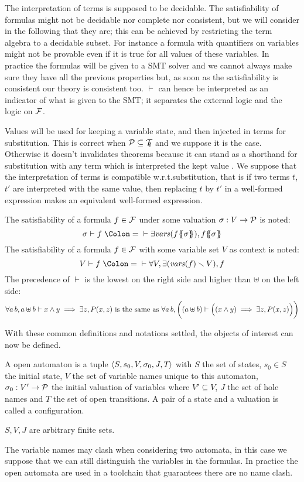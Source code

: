 \documentclass{article}
\begin{document}
The interpretation of terms is supposed to be decidable.
The satisfiability of formulas might not be decidable nor complete nor consistent,
but we will consider in the following that they are; this can be achieved by restricting the term algebra to a decidable subset.
For instance a formula with quantifiers on variables might not be provable even if it is true for all values of these variables.
In practice the formulas will be given to a SMT solver and we cannot always make sure they have all the previous properties but, as soon as the satisfiability is consistent our theory is consistent too.
\(\vdash\) can hence be interpreted as an indicator of what is given to the SMT; it separates the external logic and the logic on \({\mathcal{F}}\).

Values will be used for keeping a variable state, and then injected in terms for substitution.
This is correct when \(\mathcal{P} \subseteq {\mathcal{T}}_{\!\!\emptyset}\) and we suppose it is the case.
Otherwise it doesn't invalidates theorems because it can stand as a shorthand for substitution with any term which is interpreted the kept value .
We suppose that the interpretation of terms is compatible w.r.t.\@ substitution, that is if two terms \(t\), \(t'\) are interpreted with the same value, then replacing \(t\) by \(t'\) in a well-formed expression makes an equivalent well-formed expression.
\begin{noti}
 The satisfiability of a formula \(f \in {\mathcal{F}}\) under some valuation \(\sigma: V \to \mathcal{P}\) is noted:
\[ \sigma \vdash f \defnotation \vdash \exists \fvars{f\psubst{\sigma}}, f\psubst{\sigma} \]
 The satisfiability of a formula \(f \in {\mathcal{F}}\) with some variable set \(V\) as context is noted:
\[ V \vdash f \defnotation \vdash \forall V, \exists\mpar{\fvars{f} \setminus V}, f \]
 The precedence of \(\vdash\) is the lowest on the right side and higher than \(\uplus\) on the left side:
\[ \forall a \, b, a \uplus b \vdash x \wedge y \implies \exists z, P{\left(x,z\right)} \text{ is the same as } \forall a \, b, \bigg((a \uplus b) \vdash \Big((x \wedge y) \implies \exists z, P{\left(x,z\right)}\Big)\bigg) \]
\end{noti}
With these common definitions and notations settled, the objects of interest can now be defined.
\begin{defi}
A open automaton is a tuple \(\left<S_{},s_{0},V_{},\sigma_{0},J_{},T_{}\right>\) with \(S\) the set of states, \(s_0 \in S\) the initial state, \(V\) the set of variable names unique to this automaton, \(\sigma_0: V' \to \mathcal{P}\) the initial valuation of variables where \(V' \subseteq V\), \(J\) the set of hole names and \(T\) the set of open transitions.
A pair of a state and a valuation is called a configuration.

\(S, V, J\) are arbitrary finite sets. %
\end{defi}
The variable names may clash when considering two automata, in this case we suppose that we can still distinguish the variables in the formulas.
In practice the open automata are used in a toolchain that guarantees there are no name clash.
\end{document}
